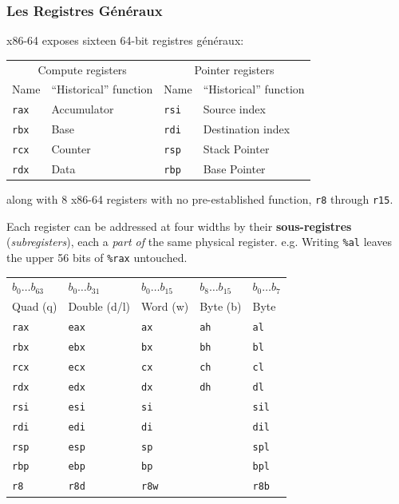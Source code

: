 \subsubsection{Les Registres Généraux}
x86-64 exposes sixteen 64-bit registres généraux:
\begin{center}
  \begin{tabular}{l l @{\qquad\qquad} l l}
    \toprule
    \multicolumn{2}{c}{Compute registers} & \multicolumn{2}{c}{Pointer registers} \\
    Name & ``Historical'' function & Name & ``Historical'' function \\
    \midrule
    \verb|rax| & Accumulator & \verb|rsi| & Source index \\
    \verb|rbx| & Base        & \verb|rdi| & Destination index \\
    \verb|rcx| & Counter     & \verb|rsp| & Stack Pointer \\
    \verb|rdx| & Data        & \verb|rbp| & Base Pointer \\
    \bottomrule
  \end{tabular}
\end{center}

\noindent along with 8 x86-64 registers with no pre-established function,
\verb|r8| through \verb|r15|.

Each register can be addressed at four widths by their \textbf{sous-registres}
(\textit{subregisters}), each a \emph{part of} the same physical register. e.g.
Writing \verb|%al| leaves the upper 56 bits of \verb|%rax| untouched.

\begin{center}
  \begin{tabular}{l l l l l}
    \toprule
    $b_0 \dots b_{63}$ & $b_0 \dots b_{31}$ & $b_0 \dots b_{15}$ & $b_8 \dots b_{15}$ & $b_0 \dots b_7$ \\
    Quad (q) & Double (d/l) & Word (w) & Byte (b) & Byte \\
    \midrule
    \verb|rax| & \verb|eax| & \verb|ax| & \verb|ah| & \verb|al| \\
    \verb|rbx| & \verb|ebx| & \verb|bx| & \verb|bh| & \verb|bl| \\
    \verb|rcx| & \verb|ecx| & \verb|cx| & \verb|ch| & \verb|cl| \\
    \verb|rdx| & \verb|edx| & \verb|dx| & \verb|dh| & \verb|dl| \\
    \verb|rsi| & \verb|esi| & \verb|si| &            & \verb|sil| \\
    \verb|rdi| & \verb|edi| & \verb|di| &            & \verb|dil| \\
    \verb|rsp| & \verb|esp| & \verb|sp| &            & \verb|spl| \\
    \verb|rbp| & \verb|ebp| & \verb|bp| &            & \verb|bpl| \\
    \verb|r8|  & \verb|r8d| & \verb|r8w| &           & \verb|r8b| \\
    \bottomrule
  \end{tabular}
\end{center}

